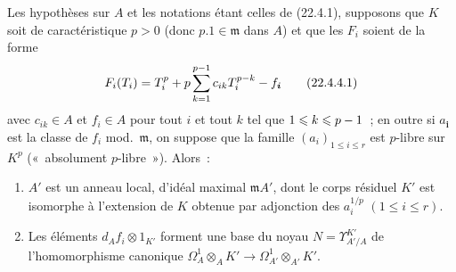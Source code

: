 \begin{proposition}[22.4.4]
\label{0.22.4.4-fr}
Les hypothèses sur $A$ et les notations étant celles de \textup{(22.4.1)}, supposons
que $K$ soit de caractéristique $p>0$ (donc $p.1\in\mathfrak m$ dans
$A$) et que les $F_i$ soient de la forme
\begin{equation}
\label{0.22.4.4.1-fr}
  F_i(T_i)=T_i^p+p\sum_{k=1}^{p-1}c_{ik}T_i^{p-k}- f_{\boldsymbol{i}}
  \tag{22.4.4.1}
\end{equation}
avec $c_{ik}\in A$ et $f_i\in A$ pour tout $i$ et tout $k$ tel que
$1\leqslant k\leqslant p- 1$~; en outre si $a_{\boldsymbol{i}}$ est la classe de $f_i$
\textup{mod.}~$\mathfrak m$, on suppose que la famille $(a_i)_{1\leqslant i\leqslant r}$
est $p$-libre sur $K^p$ \textup{(«~absolument $p$-libre~»)}. Alors~:
\begin{enumerate}
  \item[\textup{(i)}] $A'$ est un anneau local, d'idéal maximal $\mathfrak mA'$,
  dont le corps résiduel $K'$ est isomorphe à l'extension de $K$ obtenue par
  adjonction des $a_i^{1/p}$ $(1\leqslant i\leqslant r)$.


  \item[\textup{(ii)}] Les éléments $d_Af_i\otimes1_{K'}$ forment une base du noyau
  $N=\Upsilon^{K'}_{A'/A}$ de l'homomorphisme canonique
  $\Omega^1_A\otimes_AK'\longrightarrow\Omega^1_{A'}\otimes_{A'}K'$.
\end{enumerate}
\end{proposition}

